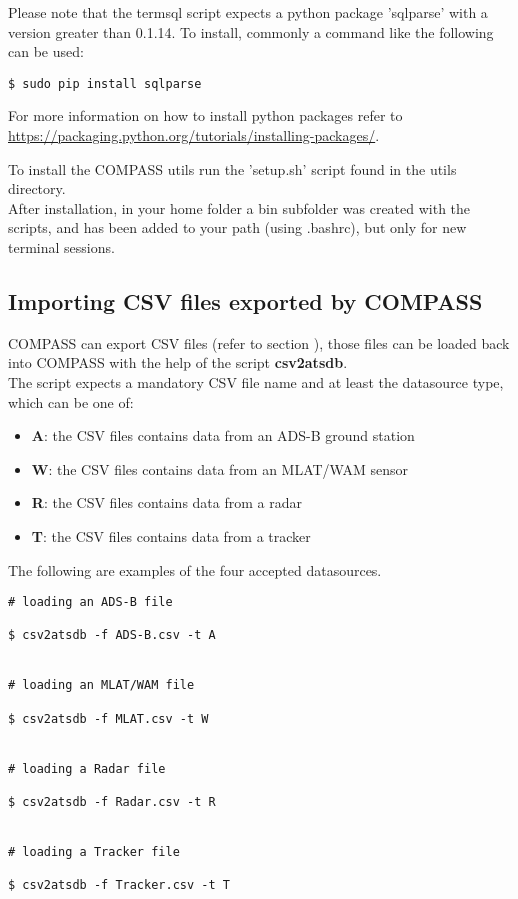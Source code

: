 Please note that the termsql script expects a python package 'sqlparse' with a version greater than 0.1.14. To install, commonly a command like the following can be used:

\begin{lstlisting}
$ sudo pip install sqlparse
\end{lstlisting}

For more information on how to install python packages refer to \url{https://packaging.python.org/tutorials/installing-packages/}.

To install the COMPASS utils run the 'setup.sh' script found in the utils directory. \\

After installation, in your home folder a bin subfolder was created with the scripts, and has been added to your path (using .bashrc), but only for new terminal sessions.

\subsection{Importing CSV files exported by COMPASS}

COMPASS can export CSV files (refer to section ), those files can be loaded back into COMPASS with the help of the script \textbf{csv2atsdb}. \\

The script expects a mandatory CSV file name and at least the datasource type, which can be one of:
\label{sec:datasrc_type}
\begin{itemize}
\item \textbf{A}: the CSV files contains data from an ADS-B ground station
\item \textbf{W}: the CSV files contains data from an MLAT/WAM sensor
\item \textbf{R}: the CSV files contains data from a radar
\item \textbf{T}: the CSV files contains data from a tracker
\\
\end{itemize}

The following are examples of the four accepted datasources.

\begin{lstlisting}
# loading an ADS-B file

$ csv2atsdb -f ADS-B.csv -t A


# loading an MLAT/WAM file

$ csv2atsdb -f MLAT.csv -t W


# loading a Radar file

$ csv2atsdb -f Radar.csv -t R


# loading a Tracker file

$ csv2atsdb -f Tracker.csv -t T
\end{lstlisting}


